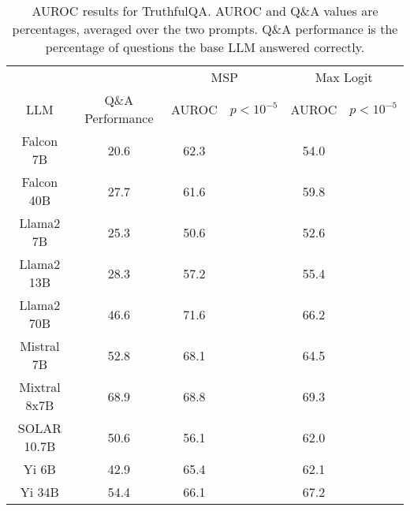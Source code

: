 \begin{table*}
\centering
\begin{tabular}{c|c|c|c|c|c}
& & \multicolumn{2}{c|}{MSP} & \multicolumn{2}{c}{Max Logit} \\ 
LLM & Q\&A Performance & AUROC & $p < 10^{-5}$ & AUROC & $p < 10^{-5}$\\ \hline
Falcon 7B & 20.6 & 62.3 &  & 54.0 & \\
Falcon 40B & 27.7 & 61.6 &  & 59.8 & \\
Llama2 7B & 25.3 & 50.6 &  & 52.6 & \\
Llama2 13B & 28.3 & 57.2 &  & 55.4 & \\
Llama2 70B & 46.6 & 71.6 &  & 66.2 & \\
Mistral 7B & 52.8 & 68.1 &  & 64.5 & \\
Mixtral 8x7B & 68.9 & 68.8 &  & 69.3 & \\
SOLAR 10.7B & 50.6 & 56.1 &  & 62.0 & \\
Yi 6B & 42.9 & 65.4 &  & 62.1 & \\
Yi 34B & 54.4 & 66.1 &  & 67.2 & \\
\hline
\end{tabular}
\caption{AUROC results for TruthfulQA. AUROC and Q\&A values are percentages, averaged over the two prompts. Q\&A performance is the percentage of questions the base LLM answered correctly.}
\label{tab:truthfulqa_auroc}
\end{table*}
